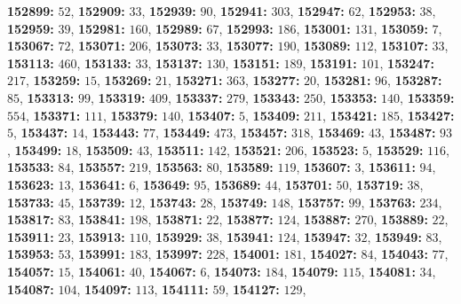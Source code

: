 \textsf{\bfseries 152899:} $52$, \textsf{\bfseries 152909:} $33$, \textsf{\bfseries 152939:} $90$, \textsf{\bfseries 152941:} $303$, \textsf{\bfseries 152947:} $62$, \textsf{\bfseries 152953:} $38$, \textsf{\bfseries 152959:} $39$, \textsf{\bfseries 152981:} $160$, \textsf{\bfseries 152989:} $67$, \textsf{\bfseries 152993:} $186$, \textsf{\bfseries 153001:} $131$, \textsf{\bfseries 153059:} $7$, \textsf{\bfseries 153067:} $72$, \textsf{\bfseries 153071:} $206$, \textsf{\bfseries 153073:} $33$, \textsf{\bfseries 153077:} $190$, \textsf{\bfseries 153089:} $112$, \textsf{\bfseries 153107:} $33$, \textsf{\bfseries 153113:} $460$, \textsf{\bfseries 153133:} $33$, \textsf{\bfseries 153137:} $130$, \textsf{\bfseries 153151:} $189$, \textsf{\bfseries 153191:} $101$, \textsf{\bfseries 153247:} $217$, \textsf{\bfseries 153259:} $15$, \textsf{\bfseries 153269:} $21$, \textsf{\bfseries 153271:} $363$, \textsf{\bfseries 153277:} $20$, \textsf{\bfseries 153281:} $96$, \textsf{\bfseries 153287:} $85$, \textsf{\bfseries 153313:} $99$, \textsf{\bfseries 153319:} $409$, \textsf{\bfseries 153337:} $279$, \textsf{\bfseries 153343:} $250$, \textsf{\bfseries 153353:} $140$, \textsf{\bfseries 153359:} $554$, \textsf{\bfseries 153371:} $111$, \textsf{\bfseries 153379:} $140$, \textsf{\bfseries 153407:} $5$, \textsf{\bfseries 153409:} $211$, \textsf{\bfseries 153421:} $185$, \textsf{\bfseries 153427:} $5$, \textsf{\bfseries 153437:} $14$, \textsf{\bfseries 153443:} $77$, \textsf{\bfseries 153449:} $473$, \textsf{\bfseries 153457:} $318$, \textsf{\bfseries 153469:} $43$, \textsf{\bfseries 153487:} $93$, \textsf{\bfseries 153499:} $18$, \textsf{\bfseries 153509:} $43$, \textsf{\bfseries 153511:} $142$, \textsf{\bfseries 153521:} $206$, \textsf{\bfseries 153523:} $5$, \textsf{\bfseries 153529:} $116$, \textsf{\bfseries 153533:} $84$, \textsf{\bfseries 153557:} $219$, \textsf{\bfseries 153563:} $80$, \textsf{\bfseries 153589:} $119$, \textsf{\bfseries 153607:} $3$, \textsf{\bfseries 153611:} $94$, \textsf{\bfseries 153623:} $13$, \textsf{\bfseries 153641:} $6$, \textsf{\bfseries 153649:} $95$, \textsf{\bfseries 153689:} $44$, \textsf{\bfseries 153701:} $50$, \textsf{\bfseries 153719:} $38$, \textsf{\bfseries 153733:} $45$, \textsf{\bfseries 153739:} $12$, \textsf{\bfseries 153743:} $28$, \textsf{\bfseries 153749:} $148$, \textsf{\bfseries 153757:} $99$, \textsf{\bfseries 153763:} $234$, \textsf{\bfseries 153817:} $83$, \textsf{\bfseries 153841:} $198$, \textsf{\bfseries 153871:} $22$, \textsf{\bfseries 153877:} $124$, \textsf{\bfseries 153887:} $270$, \textsf{\bfseries 153889:} $22$, \textsf{\bfseries 153911:} $23$, \textsf{\bfseries 153913:} $110$, \textsf{\bfseries 153929:} $38$, \textsf{\bfseries 153941:} $124$, \textsf{\bfseries 153947:} $32$, \textsf{\bfseries 153949:} $83$, \textsf{\bfseries 153953:} $53$, \textsf{\bfseries 153991:} $183$, \textsf{\bfseries 153997:} $228$, \textsf{\bfseries 154001:} $181$, \textsf{\bfseries 154027:} $84$, \textsf{\bfseries 154043:} $77$, \textsf{\bfseries 154057:} $15$, \textsf{\bfseries 154061:} $40$, \textsf{\bfseries 154067:} $6$, \textsf{\bfseries 154073:} $184$, \textsf{\bfseries 154079:} $115$, \textsf{\bfseries 154081:} $34$, \textsf{\bfseries 154087:} $104$, \textsf{\bfseries 154097:} $113$, \textsf{\bfseries 154111:} $59$, \textsf{\bfseries 154127:} $129$, 
